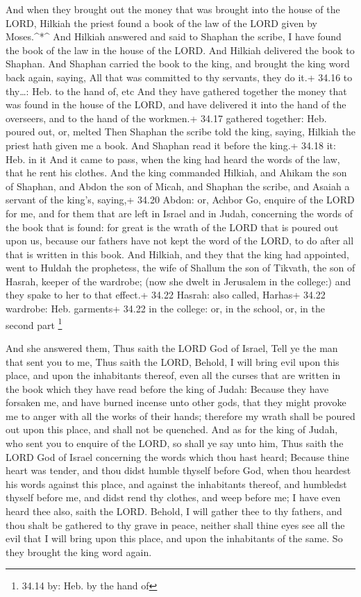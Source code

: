  And when they brought out the money that was brought into
the house of the LORD, Hilkiah the priest found a book of the law of the
LORD given by Moses.\^{}*\^{}  And Hilkiah answered and
said to Shaphan the scribe, I have found the book of the law in the
house of the LORD. And Hilkiah delivered the book to Shaphan.
 And Shaphan carried the book to the king, and brought the
king word back again, saying, All that was committed to thy servants,
they do it.+ 34.16 to thy\ldots: Heb. to the hand of, etc 
And they have gathered together the money that was found in the house of
the LORD, and have delivered it into the hand of the overseers, and to
the hand of the workmen.+ 34.17 gathered together: Heb. poured out, or,
melted  Then Shaphan the scribe told the king, saying,
Hilkiah the priest hath given me a book. And Shaphan read it before the
king.+ 34.18 it: Heb. in it  And it came to pass, when the
king had heard the words of the law, that he rent his clothes.
 And the king commanded Hilkiah, and Ahikam the son of
Shaphan, and Abdon the son of Micah, and Shaphan the scribe, and Asaiah
a servant of the king's, saying,+ 34.20 Abdon: or, Achbor 
Go, enquire of the LORD for me, and for them that are left in Israel and
in Judah, concerning the words of the book that is found: for great is
the wrath of the LORD that is poured out upon us, because our fathers
have not kept the word of the LORD, to do after all that is written in
this book.  And Hilkiah, and they that the king had
appointed, went to Huldah the prophetess, the wife of Shallum the son of
Tikvath, the son of Hasrah, keeper of the wardrobe; (now she dwelt in
Jerusalem in the college:) and they spake to her to that effect.+ 34.22
Hasrah: also called, Harhas+ 34.22 wardrobe: Heb. garments+ 34.22 in the
college: or, in the school, or, in the second part \footnote{34.14 by:
  Heb. by the hand of}

 And she answered them, Thus saith the LORD God of Israel,
Tell ye the man that sent you to me,  Thus saith the LORD,
Behold, I will bring evil upon this place, and upon the inhabitants
thereof, even all the curses that are written in the book which they
have read before the king of Judah:  Because they have
forsaken me, and have burned incense unto other gods, that they might
provoke me to anger with all the works of their hands; therefore my
wrath shall be poured out upon this place, and shall not be quenched.
 And as for the king of Judah, who sent you to enquire of
the LORD, so shall ye say unto him, Thus saith the LORD God of Israel
concerning the words which thou hast heard;  Because thine
heart was tender, and thou didst humble thyself before God, when thou
heardest his words against this place, and against the inhabitants
thereof, and humbledst thyself before me, and didst rend thy clothes,
and weep before me; I have even heard thee also, saith the LORD.
 Behold, I will gather thee to thy fathers, and thou shalt
be gathered to thy grave in peace, neither shall thine eyes see all the
evil that I will bring upon this place, and upon the inhabitants of the
same. So they brought the king word again.

